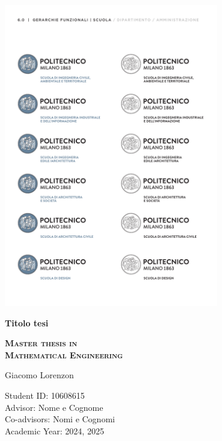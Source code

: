 




\pagestyle{empty} %
\frontmatter 


\begin{titlepage}
    \includegraphics[width=0.7\textwidth]{0_front/logo.pdf}\par
    \vspace{2.5cm}
    {{\singlespacing \huge \bfseries Titolo tesi \par}}	
    \vspace{2.5cm}
    \begin{adjustwidth}{2.87cm}{0cm}
        {\bfseries \large \textsc{Master thesis in}}\\
        {\bfseries \large \textsc{Mathematical Engineering}}\hfill
    
    \vspace{1.5 cm}
        {\large{Giacomo Lorenzon}}\hfill \par
    \vspace*{\fill}
        \normalsize{
        Student ID: 10608615\\
        Advisor: Nome e Cognome\\
        Co-advisors: Nomi e Cognomi\\
        Academic Year: 2024, 2025
        }
    \end{adjustwidth}
\end{titlepage}

